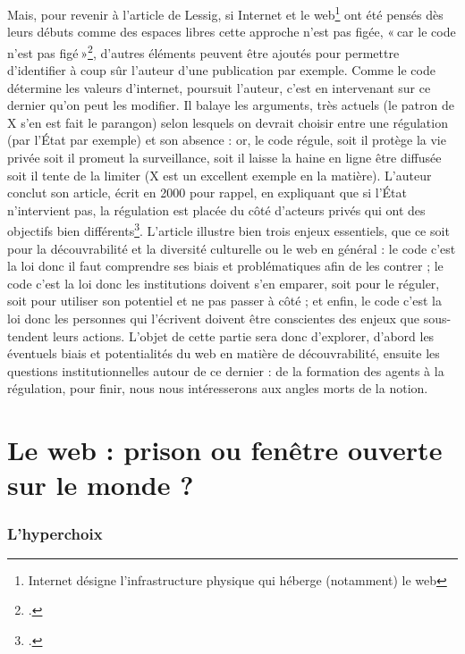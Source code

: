 Mais, pour revenir à l’article de Lessig, si Internet et le web\footnote{Internet désigne l'infrastructure physique qui héberge (notamment) le web} ont été pensés dès leurs débuts comme des espaces libres cette approche n’est pas figée, « car le code n’est pas figé »\footcite[§ 6]{lessig_code_2000}, d’autres éléments peuvent être ajoutés pour permettre d’identifier à coup sûr l’auteur d’une publication par exemple. Comme le code détermine les valeurs d’internet, poursuit l’auteur, c’est en intervenant sur ce dernier qu’on peut les modifier. Il balaye les arguments, très actuels (le patron de X s’en est fait le parangon) selon lesquels on devrait choisir entre une régulation (par l’État par exemple) et son absence : or, le code régule, soit il protège la vie privée soit il promeut la surveillance, soit il laisse la haine en ligne être diffusée soit il tente de la limiter (X est un excellent exemple en la matière). L’auteur conclut son article, écrit en 2000 pour rappel, en expliquant que si l’État n’intervient pas, la régulation est placée du côté d’acteurs privés qui ont des objectifs bien différents\footcite[§ 28]{lessig_code_2000}. L’article illustre bien trois enjeux essentiels, que ce soit pour la découvrabilité et la diversité culturelle ou le web en général : le code c’est la loi donc il faut comprendre ses biais et problématiques afin de les contrer ; le code c’est la loi donc les institutions doivent s’en emparer, soit pour le réguler, soit pour utiliser son potentiel et ne pas passer à côté ; et enfin, le code c’est la loi donc les personnes qui l’écrivent doivent être conscientes des enjeux que sous-tendent leurs actions. L’objet de cette partie sera donc d’explorer, d’abord les éventuels biais et potentialités du web en matière de découvrabilité, ensuite les questions institutionnelles autour de ce dernier : de la formation des agents à la régulation, pour finir, nous nous intéresserons aux angles morts de la notion.

\chapter{Le web : prison ou fenêtre ouverte sur le monde ?}

\subsection{L'hyperchoix}

